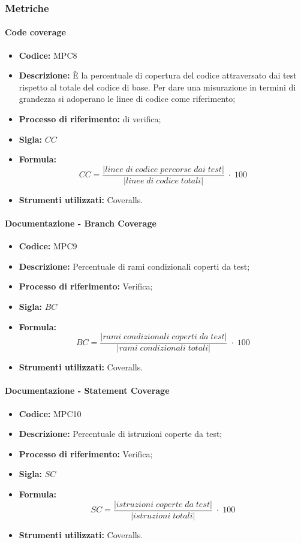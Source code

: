 \subsubsection{Metriche}

\paragraph{Code coverage}
\begin{itemize}
	\item \textbf{Codice:} MPC8
	\item \textbf{Descrizione:} È la percentuale di copertura del codice attraversato dai test rispetto al totale del codice di base. Per dare una misurazione in termini di grandezza si adoperano le linee di codice come riferimento;
	\item \textbf{Processo di riferimento:}  di verifica;
	\item \textbf{Sigla:} $CC$
	\item \textbf{Formula:} $$CC = \frac{|linee \; di \; codice \; percorse \; dai  \; test|}{|linee \; di \; codice \; totali|} \; \cdot \; 100$$
	\item \textbf{Strumenti utilizzati:} Coveralls.
\end{itemize}

\paragraph{Documentazione - Branch Coverage}
\begin{itemize}
    \item \textbf{Codice:} MPC9
    \item \textbf{Descrizione:} Percentuale di rami condizionali coperti da test;
    \item \textbf{Processo di riferimento:} Verifica;
    \item \textbf{Sigla:} $BC$
    \item \textbf{Formula:} $$BC = \frac{|rami \; condizionali \; coperti \; da \; test|}{|rami \; condizionali \; totali|} \; \cdot \; 100$$
    \item \textbf{Strumenti utilizzati:} Coveralls.
\end{itemize}

\paragraph{Documentazione - Statement Coverage}
\begin{itemize}
    \item \textbf{Codice:} MPC10
    \item \textbf{Descrizione:} Percentuale di istruzioni coperte da test;
    \item \textbf{Processo di riferimento:} Verifica;
    \item \textbf{Sigla:} $SC$
    \item \textbf{Formula:} $$SC = \frac{|istruzioni \; coperte \; da \; test|}{|istruzioni \; totali|} \; \cdot \; 100$$
    \item \textbf{Strumenti utilizzati:} Coveralls.
\end{itemize}

